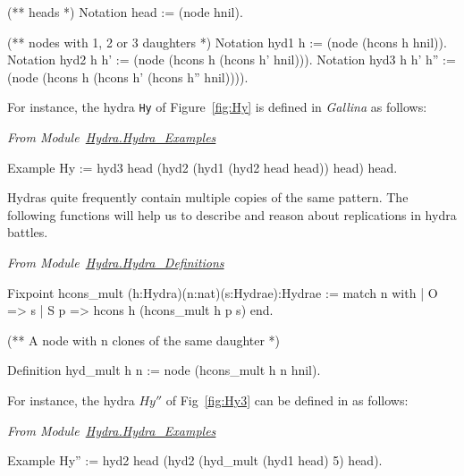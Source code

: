 \begin{Coqsrc}
(** heads *)
Notation head := (node hnil).
 
(** nodes  with 1, 2 or 3 daughters *)
Notation hyd1 h := (node (hcons h hnil)).
Notation hyd2 h h' := (node (hcons h (hcons h' hnil))).
Notation hyd3 h h' h'' := 
                   (node (hcons h (hcons h' (hcons h'' hnil)))).
\end{Coqsrc}


For instance, the hydra \texttt{Hy}  of Figure~\vref{fig:Hy} is defined in \emph{Gallina} as follows:

\vspace{4mm}
\noindent
\emph{From Module~\href{../theories/html/hydras.Hydra.Hydra_Examples.html\#Hy}{Hydra.Hydra\_Examples}}

\begin{Coqsrc}
Example Hy := hyd3 head
                   (hyd2
                      (hyd1 
                         (hyd2 head head))
                      head) 
                   head.
\end{Coqsrc}



Hydras quite frequently contain  multiple  copies of the same pattern. The following functions
will help us to describe and reason about replications in hydra battles.

\vspace{4pt}
\noindent
\emph{From Module~\href{../theories/html/hydras.Hydra.Hydra_Definitions.html\#hcons_mult}{Hydra.Hydra\_Definitions}}

\begin{Coqsrc}
Fixpoint hcons_mult (h:Hydra)(n:nat)(s:Hydrae):Hydrae :=
  match n with 
  | O => s
  | S p => hcons h (hcons_mult h p s)
  end.

(** A node with n clones of the same daughter *)

Definition hyd_mult h n :=
  node (hcons_mult h n hnil).
\end{Coqsrc}

\vspace{4mm}



For instance, the hydra $Hy''$ of Fig~\vref{fig:Hy3}  can be defined in \coq{} as follows:

\vspace{4pt}
\noindent
\emph{From Module~\href{../theories/html/hydras.Hydra.Hydra_Examples.html}{Hydra.Hydra\_Examples}}

\begin{Coqsrc}
Example Hy'' := 
     hyd2 head
          (hyd2 (hyd_mult (hyd1 head) 5)
                head).
\end{Coqsrc}




